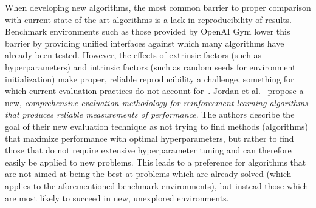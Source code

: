 When developing new algorithms, the most common barrier to proper comparison with current state-of-the-art algorithms is a lack in reproducibility of results. Benchmark environments such as those provided by OpenAI Gym \cite{OpenAIGym} lower this barrier by providing unified interfaces against which many algorithms have already been tested. However, the effects of extrinsic factors (such as hyperparameters) and intrinsic factors (such as random seeds for environment initialization) make proper, reliable reproducibility a challenge, something for which current evaluation practices do not account for~\cite{DRLThatMatters}. Jordan et al.~\cite{EvaluatingPerformance} propose a new, \emph{comprehensive evaluation methodology for reinforcement learning algorithms that produces reliable measurements of performance}. The authors describe the goal of their new evaluation technique as not trying to find methods (algorithms) that maximize performance with optimal hyperparameters, but rather to find those that do not require extensive hyperparameter tuning and can therefore easily be applied to new problems. This leads to a preference for algorithms that are not aimed at being the best at problems which are already solved (which applies to the aforementioned benchmark environments), but instead those which are most likely to succeed in new, unexplored environments.